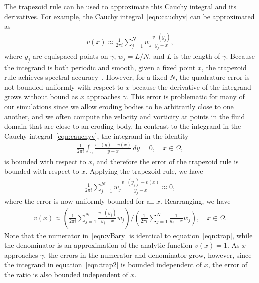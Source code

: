 \documentclass[3p]{elsarticle}
\begin{document}
The trapezoid rule can be used to approximate this Cauchy integral and
its derivatives. For example, the Cauchy integral~\eqref{eqn:cauchyv}
can be approximated as
\begin{align}
  v(x) \approx \frac{1}{2\pi i} \sum_{j=1}^{N} 
    w_j \frac{v^{-}(y_j)}{y_j - x},
  \label{eqn:trap}
\end{align}
where $y_j$ are equispaced points on $\gamma$, $w_j = L/N$, and $L$ is
the length of $\gamma$. Because the integrand is both periodic and
smooth, given a fixed point $x$, the trapezoid rule achieves spectral
accuracy~\cite{tre-wei2014}. However, for a fixed $N$, the quadrature
error is not bounded uniformly with respect to $x$ because the
derivative of the integrand grows without bound as $x$ approaches
$\gamma$. This error is problematic for many of our simulations since we
allow eroding bodies to be arbitrarily close to one another, and we
often compute the velocity and vorticity at points in the fluid domain
that are close to an eroding body. In contrast to the integrand in the
Cauchy integral~\eqref{eqn:cauchyv}, the integrand in the identity
\begin{align}
  \frac{1}{2\pi i}\int_{\gamma} 
    \frac{v^{-}(y) - v(x)}{y-x} \, dy = 0, \quad x \in \Omega,
  \label{eqn:trap2}
\end{align}
is bounded with respect to $x$, and therefore the error of the trapezoid
rule is bounded with respect to $x$. Applying the trapezoid rule, we
have
\begin{align}
  \frac{1}{2\pi i}\sum_{j=1}^{N} w_{j} 
    \frac{v^{-}(y_j) - v(x)}{y_j - x} \approx 0,
\end{align}
where the error is now uniformly bounded for all $x$. Rearranging, we
have
\begin{align}
  v(x) \approx \left(\frac{1}{2\pi i}\sum_{j=1}^N 
    \frac{v^{-}(y_j)}{y_j - x} w_j \right) \Bigg/
  \left(\frac{1}{2\pi i}\sum_{j=1}^N \frac{1}{y_j - x} w_j \right), 
  \quad x \in \Omega.
  \label{eqn:vBary}
\end{align}
Note that the numerator in~\eqref{eqn:vBary} is identical to
equation~\eqref{eqn:trap}, while the denominator is an approximation of
the analytic function $v(x) = 1$. As $x$ approaches $\gamma$, the errors
in the numerator and denominator grow, however, since the integrand in
equation~\eqref{eqn:trap2} is bounded independent of $x$, the error of
the ratio is also bounded independent of $x$.
\end{document}
